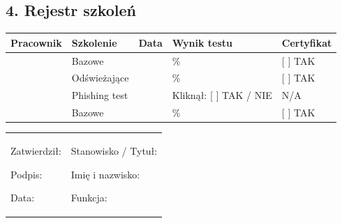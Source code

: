 \documentclass[12pt,a4paper]{article}
\begin{document}
\subsection{4. Rejestr szkoleń}\label{rejestr-szkoleux144}

\begin{longtable}[]{@{}>{\raggedright\arraybackslash}p{}>{\raggedright\arraybackslash}p{}>{\raggedright\arraybackslash}p{}>{\raggedright\arraybackslash}p{}>{\raggedright\arraybackslash}p{}@{}}
\toprule\noalign{}
Pracownik & Szkolenie & Data & Wynik testu & Certyfikat \\
\midrule\noalign{}
\endhead
\bottomrule\noalign{}
\endlastfoot
\underline{\hspace{3cm}} & Bazowe & \underline{\hspace{2cm}} &
\underline{\hspace{2cm}}\% & {[} {]} TAK \\
\underline{\hspace{3cm}} & Odświeżające & \underline{\hspace{2cm}} &
\underline{\hspace{2cm}}\% & {[} {]} TAK \\
\underline{\hspace{3cm}} & Phishing test & \underline{\hspace{2cm}}
& Kliknął: {[} {]} TAK / NIE & N/A \\
\underline{\hspace{3cm}} & Bazowe & \underline{\hspace{2cm}} &
\underline{\hspace{2cm}}\% & {[} {]} TAK \\
\end{longtable}

\begin{longtable}[]{@{}
  >{\raggedright\arraybackslash}p{}
  >{\raggedright\arraybackslash}p{}@{}}
\toprule\noalign{}
\endhead
\bottomrule\noalign{}
\endlastfoot
\begin{minipage}[t]{\linewidth}\raggedright
Zatwierdził:

Podpis: \underline{\hspace{3cm}}

Data: \underline{\hspace{4cm}}
\end{minipage} & \begin{minipage}[t]{\linewidth}\raggedright
Stanowisko / Tytuł:

Imię i nazwisko: \underline{\hspace{3cm}}

Funkcja: \underline{\hspace{3cm}}
\end{minipage} \\
\end{longtable}
\end{document}
